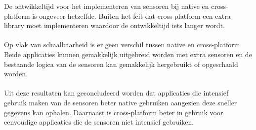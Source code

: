 De ontwikkeltijd voor het implementeren van sensoren
bij native en cross-platform is ongeveer hetzelfde. Buiten het feit dat cross-platform een extra library moet
implementeren waardoor de ontwikkeltijd iets langer wordt. 
\\\\
Op vlak van schaalbaarheid is er geen verschil tussen native en cross-platform. Beide applicaties kunnen
gemakkelijk uitgebreid worden met extra sensoren en de bestaande logica van de sensoren kan gemakkelijk 
hergebruikt of opgeschaald worden.
\\\\
Uit deze resultaten kan geconcludeerd worden dat applicaties die intensief gebruik maken van de sensoren 
beter native gebruiken aangezien deze sneller gegevens kan ophalen. Daarnaast is cross-platform beter in gebruik 
voor eenvoudige applicaties die de sensoren niet intensief gebruiken.















